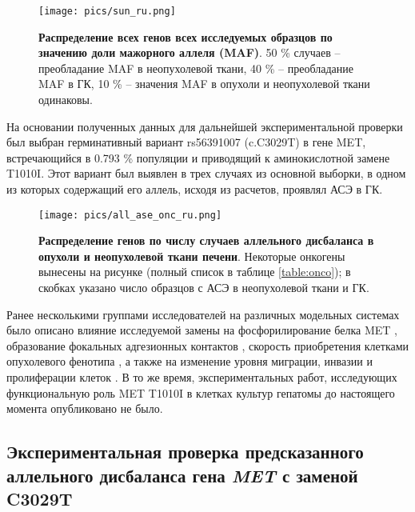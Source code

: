 \begin{figure}[H]
	\centering
	\texttt{[image: pics/sun\_ru.png]}
	\caption{\textbf{Распределение всех генов всех исследуемых образцов по значению доли мажорного аллеля (MAF)}. 50 \% случаев -- преобладание MAF в неопухолевой ткани, 40 \% -- преобладание MAF в ГК, 10 \% -- значения MAF в опухоли и неопухолевой ткани одинаковы.}
	\label{fig:sun}
\end{figure}


На основании полученных данных для дальнейшей экспериментальной проверки был выбран герминативный вариант rs56391007 (c.C3029T) в гене MET, встречающийся в 0.793 \% популяции \cite{lek_analysis_2016} и приводящий к аминокислотной замене T1010I. Этот вариант был выявлен в трех случаях из основной выборки, в одном из которых содержащий его аллель, исходя из расчетов, проявлял АСЭ в ГК.

\begin{figure}[H]
	\centering
	\texttt{[image: pics/all\_ase\_onc\_ru.png]}
	\caption{\textbf{Распределение генов по числу случаев аллельного дисбаланса в опухоли и неопухолевой ткани печени}. Некоторые онкогены вынесены на рисунке (полный список в таблице \ref{table:onco}); в скобках указано число образцов с АСЭ в неопухолевой ткани и ГК.}
	\label{fig:all_ase}
\end{figure}

Ранее несколькими группами исследователей на различных модельных системах было описано влияние исследуемой замены на фосфорилирование белка MET \cite{schmidt_novel_1999, ma_c-met_2003, liu_functional_2015}, образование фокальных адгезионных контактов \cite{lee_novel_2000}, скорость приобретения клетками опухолевого фенотипа \cite{lee_novel_2000}, а также на изменение уровня миграции, инвазии и пролиферации клеток \cite{lee_novel_2000, liu_functional_2015}. В то же время, экспериментальных работ, исследующих функциональную роль MET T1010I в клетках культур гепатомы до настоящего момента опубликовано не было.

\subsection{Экспериментальная проверка предсказанного аллельного дисбаланса гена \textit{MET} с заменой C3029T}

